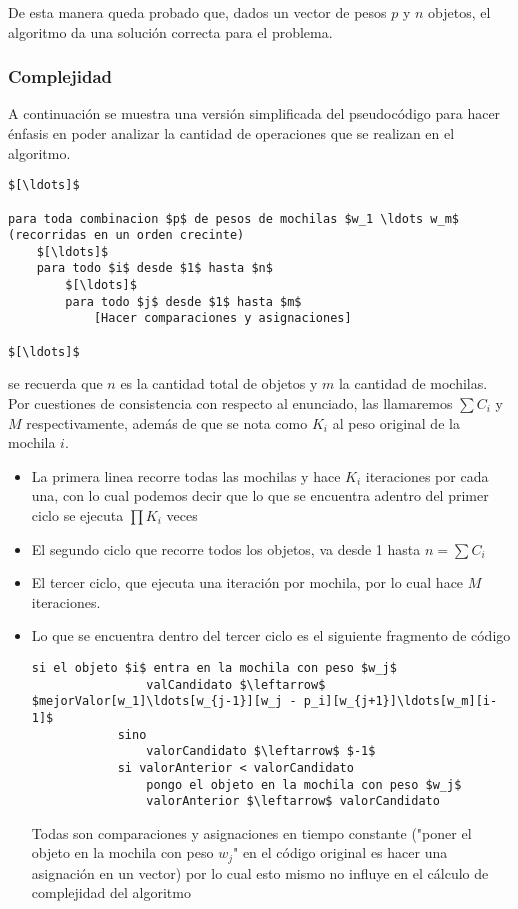 De esta manera queda probado que, dados un vector de pesos $p$ y $n$ objetos, el algoritmo da una solución correcta para el problema. \QEDB

\subsubsection{Complejidad}

A continuación se muestra una versión simplificada del pseudocódigo para hacer énfasis en poder analizar la cantidad de operaciones que se realizan en el algoritmo.

\lstset{basicstyle=\large}
\begin{lstlisting}
$[\ldots]$

para toda combinacion $p$ de pesos de mochilas $w_1 \ldots w_m$ (recorridas en un orden crecinte)
	$[\ldots]$
	para todo $i$ desde $1$ hasta $n$
		$[\ldots]$
		para todo $j$ desde $1$ hasta $m$
			[Hacer comparaciones y asignaciones]

$[\ldots]$

\end{lstlisting}

se recuerda que $n$ es la cantidad total de objetos y $m$ la cantidad de mochilas. Por cuestiones de consistencia con respecto al enunciado, las llamaremos $\sum C_i$ y $M$ respectivamente, además de que se nota como $K_i$ al peso original de la mochila $i$.

\begin{itemize}
\item La primera linea recorre todas las mochilas y hace $K_i$ iteraciones por cada una, con lo cual podemos decir que lo que se encuentra adentro del primer ciclo se ejecuta $\prod K_i$ veces

\item El segundo ciclo que recorre todos los objetos, va desde 1 hasta $n = \sum C_i$

\item El tercer ciclo, que ejecuta una iteración por mochila, por lo cual hace $M$ iteraciones.

\item Lo que se encuentra dentro del tercer ciclo es el siguiente fragmento de código

\lstset{basicstyle=\large}
\begin{lstlisting}
si el objeto $i$ entra en la mochila con peso $w_j$
				valCandidato $\leftarrow$ $mejorValor[w_1]\ldots[w_{j-1}][w_j - p_i][w_{j+1}]\ldots[w_m][i-1]$
			sino
				valorCandidato $\leftarrow$ $-1$
			si valorAnterior < valorCandidato
				pongo el objeto en la mochila con peso $w_j$
				valorAnterior $\leftarrow$ valorCandidato
\end{lstlisting}

Todas son comparaciones y asignaciones en tiempo constante ("poner el objeto en la mochila con peso $w_j$" en el código original es hacer una asignación en un vector) por lo cual esto mismo no influye en el cálculo de complejidad del algoritmo
\end{itemize}

